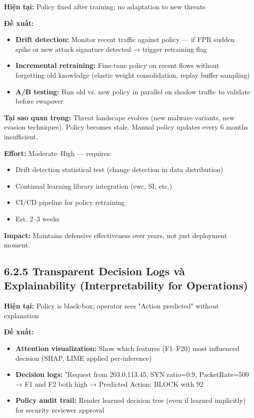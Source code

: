 \documentclass[12pt,a4paper,twoside]{report}
\begin{document}
{{{{{{{{{{{{{{\textbf{Hiện tại:} Policy fixed after training; no adaptation to new threats

\textbf{Đề xuất:}
\begin{itemize}
\item \textbf{Drift detection:} Monitor recent traffic against policy — if FPR sudden spike or new attack signature detected → trigger retraining flag
\item \textbf{Incremental retraining:} Fine-tune policy on recent flows without forgetting old knowledge (elastic weight consolidation, replay buffer sampling)
\item \textbf{A/B testing:} Run old vs. new policy in parallel on shadow traffic to validate before swapover
\end{itemize}

\textbf{Tại sao quan trọng:} Threat landscape evolves (new malware variants, new evasion techniques). Policy becomes stale. Manual policy updates every 6 months insufficient.

\textbf{Effort:} Moderate–High — requires:
\begin{itemize}
\item Drift detection statistical test (change detection in data distribution)
\item Continual learning library integration (ewc, SI, etc.)
\item CI/CD pipeline for policy retraining
\item Est. 2–3 weeks
\end{itemize}

\textbf{Impact:} Maintains defensive effectiveness over years, not just deployment moment.


\subsection{6.2.5 Transparent Decision Logs và Explainability (Interpretability for Operations)}

\textbf{Hiện tại:} Policy is black-box; operator sees "Action predicted" without explanation

\textbf{Đề xuất:}
\begin{itemize}
\item \textbf{Attention visualization:} Show which features (F1–F20) most influenced decision (SHAP, LIME applied per-inference)
\item \textbf{Decision logs:} "Request from 203.0.113.45, SYN ratio=0.9, PacketRate=500 → F1 and F2 both high → Predicted Action: BLOCK with 92%
\item \textbf{Policy audit trail:} Render learned decision tree (even if learned implicitly) for security reviewer approval
\end{itemize}

}}}}}}}}}}}}}}
\end{document}
